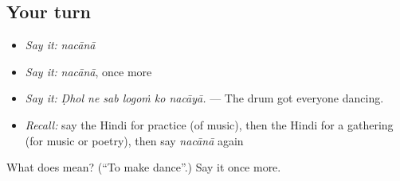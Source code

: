 \subsection*{Your turn}
\begin{itemize}
\raggedright
  \item \emph{Say it:} \emph{nacānā}
  \item \emph{Say it:} \emph{nacānā}, once more
  \item \emph{Say it:} \emph{Ḍhol ne sab logoṁ ko nacāyā.} — The drum got everyone dancing.
  \item \emph{Recall:} say the Hindi for practice (of music), then the Hindi for a gathering (for music or poetry), then say \emph{nacānā} again
\end{itemize}

\begin{tcolorbox}[breakable,colback=teal!4,colframe=teal!35!black,title={Before you move on}]
What does  mean? (\textquotedblleft{}To make dance\textquotedblright{}.) Say it once more.
\end{tcolorbox}
